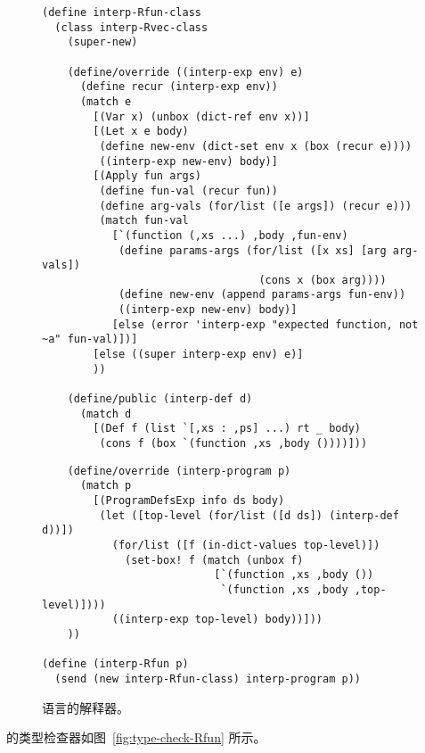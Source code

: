 \documentclass[11pt]{book}
\newcommand{\margincomment}[1]{\marginpar{\color{comment-red}\tiny #1}}
\newcommand{\margincomment}[1]{}
\begin{document}
\begin{figure}[tp]
\begin{lstlisting}
(define interp-Rfun-class
  (class interp-Rvec-class
    (super-new)

    (define/override ((interp-exp env) e)
      (define recur (interp-exp env))
      (match e
        [(Var x) (unbox (dict-ref env x))]
        [(Let x e body)
         (define new-env (dict-set env x (box (recur e))))
         ((interp-exp new-env) body)]
        [(Apply fun args)
         (define fun-val (recur fun))
         (define arg-vals (for/list ([e args]) (recur e)))
         (match fun-val
           [`(function (,xs ...) ,body ,fun-env)
            (define params-args (for/list ([x xs] [arg arg-vals])
                                  (cons x (box arg))))
            (define new-env (append params-args fun-env))
            ((interp-exp new-env) body)]
           [else (error 'interp-exp "expected function, not ~a" fun-val)])]
        [else ((super interp-exp env) e)]
        ))

    (define/public (interp-def d)
      (match d
        [(Def f (list `[,xs : ,ps] ...) rt _ body)
         (cons f (box `(function ,xs ,body ())))]))
\end{lstlisting}
\end{figure}
\begin{figure}[tp]
\begin{lstlisting}
    (define/override (interp-program p)
      (match p
        [(ProgramDefsExp info ds body)
         (let ([top-level (for/list ([d ds]) (interp-def d))])
           (for/list ([f (in-dict-values top-level)])
             (set-box! f (match (unbox f)
                           [`(function ,xs ,body ())
                            `(function ,xs ,body ,top-level)])))
           ((interp-exp top-level) body))]))
    ))

(define (interp-Rfun p)
  (send (new interp-Rfun-class) interp-program p))
\end{lstlisting}
\caption{ \LangFun{} 语言的解释器。}
\label{fig:interp-Rfun}
\end{figure}


\margincomment{TODO: explain type checker}

 \LangFun{} 的类型检查器如图~\ref{fig:type-check-Rfun} 所示。
\end{document}
